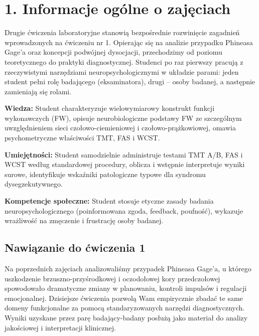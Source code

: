 \documentclass[11pt,a4paper]{article}
\begin{document}
\vspace{0.6cm}

\section{1. Informacje ogólne o zajęciach}

Drugie ćwiczenia laboratoryjne stanowią bezpośrednie rozwinięcie zagadnień wprowadzonych na ćwiczeniu nr 1. Opierając się na analizie przypadku Phineasa Gage'a oraz koncepcji podwójnej dysocjacji, przechodzimy od poziomu teoretycznego do praktyki diagnostycznej. Studenci po raz pierwszy pracują z rzeczywistymi narzędziami neuropsychologicznymi w układzie parami: jeden student pełni rolę badającego (eksaminatora), drugi – osoby badanej, a następnie zamieniają się rolami.

\vspace{0.2cm}

\begin{tcolorbox}[
    enhanced,
    colback=lightbgblue,
    colframe=navyheader,
    arc=0mm,
    boxrule=1pt,
    title={\small\textbf{Cele kształcenia (zgodne z KRK -- poziom 6. EQF)}},
    coltitle=white,
    colbacktitle=navyheader,
    left=12pt,
    right=12pt,
    top=10pt,
    bottom=10pt
]
\normalsize
\textbf{Wiedza:} 
Student charakteryzuje wielowymiarowy konstrukt funkcji wykonawczych (FW), opisuje neurobiologiczne podstawy FW ze szczególnym uwzględnieniem sieci czołowo-ciemieniowej i czołowo-prążkowiowej, omawia psychometryczne właściwości TMT, FAS i WCST.
\vspace{0.6em}

\textbf{Umiejętności:} 
Student samodzielnie administruje testami TMT A/B, FAS i WCST według standardowej procedury, oblicza i wstępnie interpretuje wyniki surowe, identyfikuje wskaźniki patologiczne typowe dla syndromu dysegzekutywnego.
\vspace{0.6em}

\textbf{Kompetencje społeczne:} 
Student stosuje etyczne zasady badania neuropsychologicznego (poinformowana zgoda, feedback, poufność), wykazuje wrażliwość na zmęczenie i frustrację osoby badanej.

\end{tcolorbox}

\subsection{Nawiązanie do ćwiczenia 1}
Na poprzednich zajęciach analizowaliśmy przypadek Phineasa Gage'a, u którego uszkodzenie brzuszno-przyśrodkowej i oczodołowej kory przedczołowej spowodowało dramatyczne zmiany w planowaniu, kontroli impulsów i regulacji emocjonalnej. Dzisiejsze ćwiczenia pozwolą Wam empirycznie zbadać te same domeny funkcjonalne za pomocą standaryzowanych narzędzi diagnostycznych. Wyniki uzyskane przez parę badający-badany posłużą jako materiał do analizy jakościowej i interpretacji klinicznej.
\end{document}
